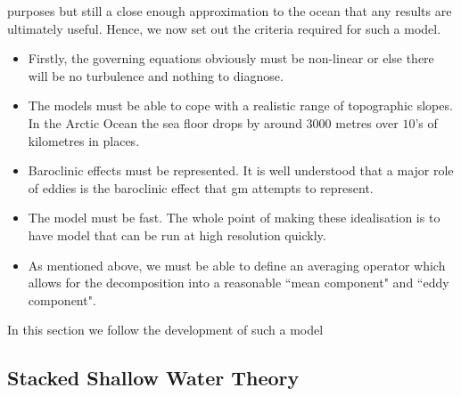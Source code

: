 \documentclass[10pt,a4paper]{article}
\begin{document}
purposes but still a close enough approximation to the ocean that any results are ultimately
 useful. Hence, we now set out the criteria required for such a model.
 \begin{itemize}
 	\item Firstly, the governing equations obviously must be non-linear or else there will be
 	no turbulence and nothing to diagnose.
 	\item The models must be able to cope with a realistic range of topographic slopes.
 	In the Arctic Ocean the sea floor drops by around $3000$ metres over $10$'s of kilometres
 	in places.
 	\item Baroclinic effects must be represented. It is well understood that a major role
 	of eddies is the baroclinic effect that \gls{gm} attempts to represent.
 	\item The model must be fast. The whole point of making these idealisation is to have model
 	 that can be run at high resolution quickly.
 	 \item As mentioned above, we must be able to define an averaging operator which 
 	 allows for the decomposition into a reasonable ``mean component" and ``eddy component".
 \end{itemize}
In this section we follow the development of such a model 


\subsection{Stacked Shallow Water Theory}
\end{document}
